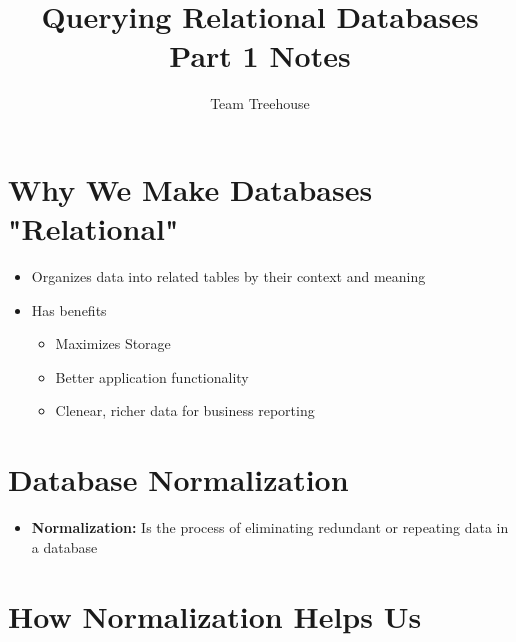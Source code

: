 \documentclass[12pt]{article}
\begin{document}
\title{Querying Relational Databases Part 1 Notes}
\author{Team Treehouse}
\maketitle

\bigskip

\section{Why We Make Databases "Relational"}

\bigskip

\begin{itemize}
    \item Organizes data into related tables by their context and meaning
    \item Has benefits
    \begin{itemize}
        \item Maximizes Storage
        \item Better application functionality
        \item Clenear, richer data for business reporting
    \end{itemize}
\end{itemize}

\bigskip

\section{Database Normalization}

\bigskip

\begin{itemize}
    \item \textbf{Normalization:} Is the process of eliminating redundant or
    repeating data in a database
\end{itemize}

\bigskip

\section{How Normalization Helps Us}

\bigskip
\end{document}
